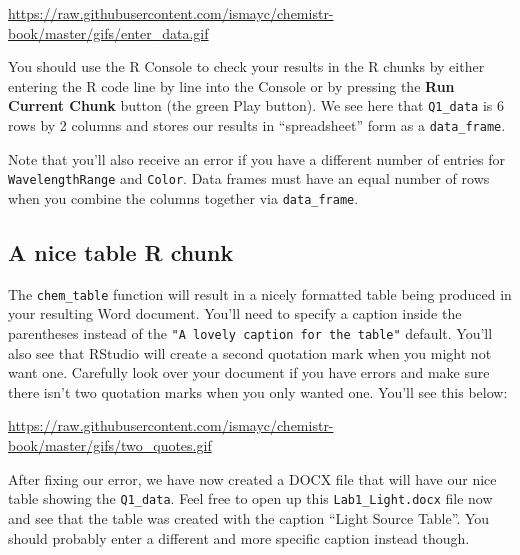 \documentclass[]{tufte-book}
\begin{document}
\vspace{0.1in}

\begin{center}\footnotesize{\url{https://raw.githubusercontent.com/ismayc/chemistr-book/master/gifs/enter_data.gif}}\end{center}

\vspace{0.1in}

You should use the R Console to check your results in the R chunks by
either entering the R code line by line into the Console or by pressing
the \textbf{Run Current Chunk} button (the green Play button). We see
here that \texttt{Q1\_data} is 6 rows by 2 columns and stores our
results in ``spreadsheet'' form as a \texttt{data\_frame}.

Note that you'll also receive an error if you have a different number of
entries for \texttt{WavelengthRange} and \texttt{Color}. Data frames
must have an equal number of rows when you combine the columns together
via \texttt{data\_frame}.

\subsection{A nice table R chunk}\label{a-nice-table-r-chunk}

The \texttt{chem\_table} function will result in a nicely formatted
table being produced in your resulting Word document. You'll need to
specify a caption inside the parentheses instead of the
\texttt{"A\ lovely\ caption\ for\ the\ table"} default. You'll also see
that RStudio will create a second quotation mark when you might not want
one. Carefully look over your document if you have errors and make sure
there isn't two quotation marks when you only wanted one. You'll see
this below:

\vspace{0.1in}

\begin{center}\footnotesize{\url{https://raw.githubusercontent.com/ismayc/chemistr-book/master/gifs/two_quotes.gif}}\end{center}

\vspace{0.1in}

After fixing our error, we have now created a DOCX file that will have
our nice table showing the \texttt{Q1\_data}. Feel free to open up this
\texttt{Lab1\_Light.docx} file now and see that the table was created
with the caption ``Light Source Table''. You should probably enter a
different and more specific caption instead though.
\end{document}
